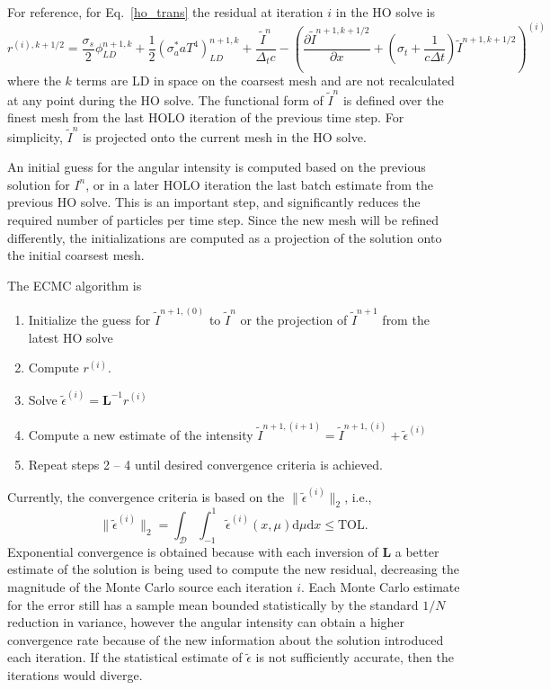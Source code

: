 \documentclass{mc2013}
\newcommand{\pderiv}[2]{\frac{\partial #1}{\partial #2}}
\newcommand{\B}[1]{\ensuremath{\mathbf{#1}}}
\renewcommand{\d}{\mathrm{d}}
\begin{document}
For reference, for Eq.~\eqref{ho_trans} the residual at iteration $i$ in the HO solve
is
\begin{equation}
r^{(i),k+1/2} = \frac{\sigma_s}{2} \phi_{LD}^{n+1,k} +\frac{1}{2} \left(\sigma_a^* a T^4
\right)_{LD}^{n+1,k} + \frac{\tilde{I}^n}{\Delta_t c} -
\left(\pderiv{\tilde{I}^{n+1,k+1/2}}{x} +
\left(\sigma_t + \frac{1}{c \Delta t }\right) \tilde{I}^{n+1,k+1/2}\right)^{(i)}
\end{equation}
where the $k$ terms are LD in space on the coarsest mesh and are not recalculated at any point during
the HO solve.  The functional form of $\tilde{I}^n$ is defined over the finest mesh from the last HOLO
iteration of the previous time step.  For simplicity, $\tilde I^n$ is projected onto the current mesh in the HO solve.
  
An initial guess for the angular intensity is computed based on the previous solution
for $I^{n}$, or in a later HOLO iteration the last batch estimate from the previous
HO solve. This is an important step, and significantly reduces the required number of
particles per time step.  Since the new mesh will be refined differently, the initializations are
computed as a projection of the solution onto the initial coarsest mesh.

  The ECMC algorithm is
\begin{enumerate}
    \item Initialize the guess for $\tilde{I}^{n+1,(0)}$ to $\tilde{I}^{n}$ or the
        projection of $\tilde{I}^{n+1}$ from the latest HO solve
\item Compute $r^{(i)}$.
\item Solve $\tilde{\epsilon}^{(i)} = \B L^{-1} r^{(i)}$
\item Compute a new estimate of the intensity $\tilde I^{n+1,(i+1)} = \tilde I^{n+1,(i)}
+ \tilde\epsilon^{(i)}$
\item Repeat steps 2 -- 4 until desired convergence criteria is achieved. 
\end{enumerate}

Currently, the convergence criteria is based on the $\|\tilde{\epsilon}^{(i)}\|_2$, i.e.,
\begin{equation}
\|\tilde{\epsilon}^{(i)}\|_2 = \int_\mathcal{D} \int_{-1}^1
\tilde{\epsilon}^{(i)}(x,\mu) \d\mu \d x\leq \text{TOL}.
\end{equation}
Exponential convergence is obtained because with each inversion of $\B L$ a
better estimate of the solution is being used to compute the new residual, decreasing
the magnitude of the Monte Carlo source each iteration $i$.  Each Monte Carlo
estimate for the error still has a sample mean bounded 
statistically by the standard $1/{N}$ reduction in variance, however the 
angular intensity can obtain a higher convergence rate because of the new information about the
solution introduced each iteration.  If the statistical estimate of $\tilde\epsilon$ is not sufficiently
accurate, then the iterations would diverge.
\end{document}
